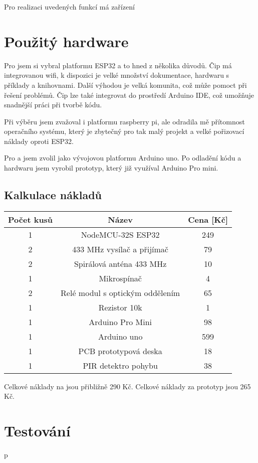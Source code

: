 \documentclass[a4paper,titlepage]{article}
\begin{document}
{Pro realizaci uvedených funkcí má zařízení  

\section{Použitý hardware}

Pro  jsem  si vybral platformu ESP32 a to hned z několika důvodů. Čip má integrovanou wifi, k dispozici je velké množství dokumentace, hardwaru s příklady a knihovnami. Další výhodou je velká komunita, což může pomoct při řešení problémů. Čip lze také integrovat do prostředí Arduino IDE, což umožňuje snadnější práci při tvorbě kódu.


Při výběru jsem zvažoval i platformu raspberry pi, ale odradila mě přítomnost operačního systému, který je zbytečný pro tak malý projekt a velké pořizovací náklady oproti ESP32.


Pro  a  jsem zvolil jako vývojovou platformu Arduino uno. Po odladění kódu a hardwaru jsem vyrobil prototyp, který již využíval Arduino Pro mini. 


\subsection{Kalkulace nákladů}
\begin{tabular}{|c|c|c|}
	\hline
	Počet kusů & Název & Cena [Kč] \\
	\hline
	1 & NodeMCU-32S ESP32 & 249  \\
	\hline
	2 & 433 MHz vysílač a přijímač & 79 \\
	\hline
	2 & Spirálová anténa 433 MHz & 10 \\
	\hline
	1 & Mikrospínač & 4 \\
	\hline
	2 & Relé modul s optickým oddělením & 65 \\
	\hline
	1 & Rezistor 10k & 1 \\
	\hline
	1 & Arduino Pro Mini & 98 \\
	\hline
	1 & Arduino uno & 599 \\
	\hline
	1 & PCB prototypová deska & 18 \\
	\hline
	1 & PIR detektro pohybu & 38 \\
	\hline
\end{tabular}

Celkové náklady na  jsou přibližně 290 Kč.
Celkové náklady za prototyp  jsou 265 Kč.

\section{Testování}
p
}
\end{document}
